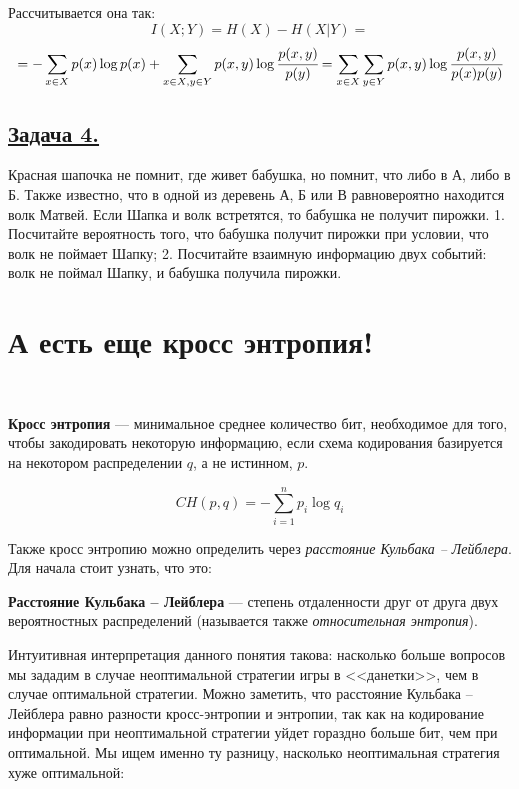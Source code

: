 Рассчитывается она так:
\[I(X; Y)=H(X)-H(X|Y)=\]
\[=-\sum\limits_{x\in X} p(x)\log p(x) +\sum\limits_{x\in X, y\in Y} p(x, y)\log \cfrac{p(x, y)}{p(y)} =
\sum\limits_{x\in X}\sum\limits_{y\in Y} p(x, y)\log \cfrac{p(x, y)}{p(x)p(y)} \]

\subsection*{\hyperref[sec:sol_problem4]{Задача 4.}}\label{sec:problem4}  Красная шапочка не помнит, где живет бабушка, но помнит, что либо в А, либо в Б. Также известно, что в одной из деревень А, Б или В равновероятно находится волк Матвей. Если Шапка и волк встретятся, то бабушка не получит пирожки. 
1.	Посчитайте вероятность того, что бабушка получит пирожки при условии, что волк не поймает Шапку;
2.	Посчитайте взаимную информацию двух событий: волк не поймал Шапку, и бабушка получила пирожки.

\section*{А есть еще кросс энтропия!}~\
\\

\begin{siderules}
    \textbf{Кросс энтропия} --- минимальное среднее количество бит, необходимое для того, чтобы закодировать некоторую информацию, если схема кодирования базируется на некотором распределении $q$, а не истинном, $p$.
\end{siderules}

\[CH(p, q)=-\sum\limits_{i=1}^{n}p_i\log q_i \]

Также кросс энтропию можно определить через \textit{расстояние Кульбака -- Лейблера}. Для начала стоит узнать, что это:

\begin{siderules}
    \textbf{Расстояние Кульбака -- Лейблера} --- степень отдаленности друг от друга двух вероятностных распределений (называется также \textit{относительная энтропия}). \end{siderules}
    
    Интуитивная интерпретация данного понятия такова: насколько больше вопросов мы зададим в случае неоптимальной стратегии игры в <<данетки>>, чем в случае оптимальной стратегии. Можно заметить, что расстояние Кульбака -- Лейблера равно разности кросс-энтропии и энтропии, так как на кодирование информации при неоптимальной стратегии уйдет гораздно больше бит, чем при оптимальной. Мы ищем именно ту разницу, насколько неоптимальная стратегия хуже оптимальной: 
    
